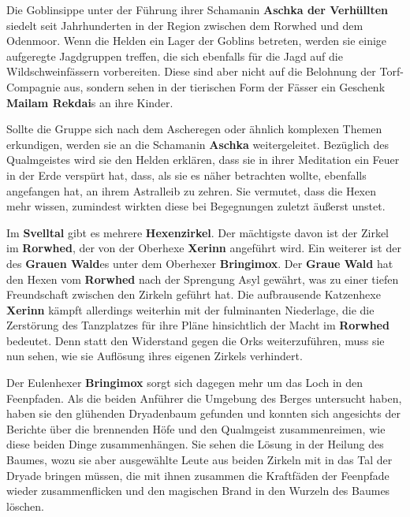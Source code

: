 
Die Goblinsippe unter der Führung ihrer Schamanin \textbf{Aschka der Verhüllten} siedelt seit Jahrhunderten in der Region zwischen dem Rorwhed und dem Odenmoor.
Wenn die Helden ein Lager der Goblins betreten, werden sie einige aufgeregte Jagdgruppen treffen, die sich ebenfalls für die Jagd auf die Wildschweinfässern vorbereiten.
Diese sind aber nicht auf die Belohnung der Torf-Compagnie aus, sondern sehen in der tierischen Form der Fässer ein Geschenk \textbf{Mailam Rekdai}s an ihre Kinder.

Sollte die Gruppe sich nach dem Ascheregen oder ähnlich komplexen Themen erkundigen, werden sie an die Schamanin \textbf{Aschka} weitergeleitet.
Bezüglich des Qualmgeistes wird sie den Helden erklären, dass sie in ihrer Meditation ein Feuer in der Erde verspürt hat, dass, als sie es näher betrachten wollte, ebenfalls angefangen hat, an ihrem Astralleib zu zehren.
Sie vermutet, dass die Hexen mehr wissen, zumindest wirkten diese bei Begegnungen zuletzt äußerst unstet.



%

Im \textbf{Svelltal} gibt es mehrere \textbf{Hexenzirkel}. Der mächtigste davon ist der Zirkel im \textbf{Rorwhed}, der von der Oberhexe \textbf{Xerinn} angeführt wird.
Ein weiterer ist der des \textbf{Grauen Wald}es unter dem Oberhexer \textbf{Bringimox}.
Der \textbf{Graue Wald} hat den Hexen vom \textbf{Rorwhed} nach der Sprengung Asyl gewährt, was zu einer tiefen Freundschaft zwischen den Zirkeln geführt hat.
Die aufbrausende Katzenhexe \textbf{Xerinn} kämpft allerdings weiterhin mit der fulminanten Niederlage, die die Zerstörung des Tanzplatzes für ihre Pläne hinsichtlich der Macht im \textbf{Rorwhed} bedeutet.
Denn statt den Widerstand gegen die Orks weiterzuführen, muss sie nun sehen, wie sie Auflösung ihres eigenen Zirkels verhindert.

Der Eulenhexer \textbf{Bringimox} sorgt sich dagegen mehr um das Loch in den Feenpfaden.
Als die beiden Anführer die Umgebung des Berges untersucht haben, haben sie den glühenden Dryadenbaum gefunden und konnten sich angesichts der Berichte über die brennenden Höfe und den Qualmgeist zusammenreimen, wie diese beiden Dinge zusammenhängen.
Sie sehen die Lösung in der Heilung des Baumes, wozu sie aber ausgewählte Leute aus beiden Zirkeln mit in das Tal der Dryade bringen müssen, die mit ihnen zusammen die Kraftfäden der Feenpfade wieder zusammenflicken und den magischen Brand in den Wurzeln des Baumes löschen.

